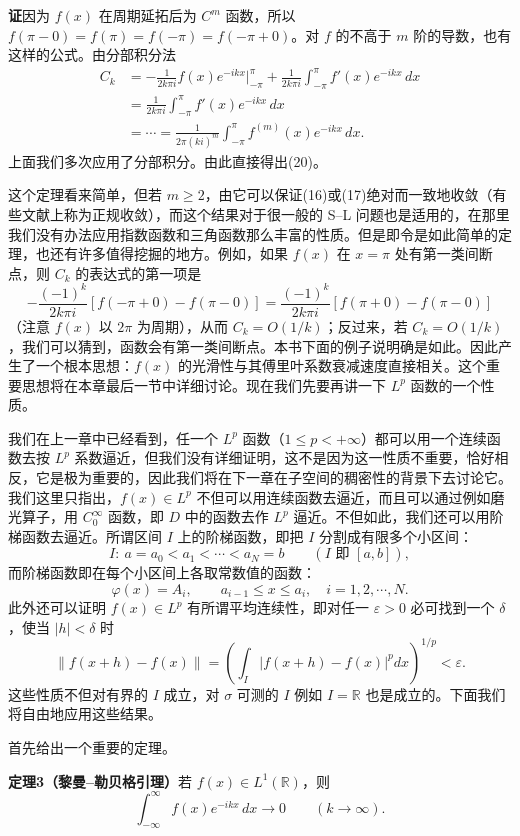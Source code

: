 \noindent\textbf{证}\quad 因为 $f(x)$ 在周期延拓后为 $C^m$ 函数，所以 $f(\pi-0)=f(\pi)=f(-\pi)=f(-\pi+0)$。对 $f$ 的不高于 $m$ 阶的导数，也有这样的公式。由分部积分法
\[
 \begin{aligned}
 C_k&=-\frac1{2k\pi i}f(x)e^{-ikx}\bigg|_{-\pi}^{\pi}
 +\frac1{2k\pi i}\int_{-\pi}^{\pi}f'(x)e^{-ikx}\,dx\\
 &=\frac1{2k\pi i}\int_{-\pi}^{\pi}f'(x)e^{-ikx}\,dx\\
 &=\cdots
 =\frac1{2\pi(ki)^m}\int_{-\pi}^{\pi}f^{(m)}(x)e^{-ikx}\,dx.
 \end{aligned}
\]
上面我们多次应用了分部积分。由此直接得出(20)。

这个定理看来简单，但若 $m\ge2$，由它可以保证(16)或(17)绝对而一致地收敛（有些文献上称为正规收敛），而这个结果对于很一般的 S--L 问题也是适用的，在那里我们没有办法应用指数函数和三角函数那么丰富的性质。但是即令是如此简单的定理，也还有许多值得挖掘的地方。例如，如果 $f(x)$ 在 $x=\pi$ 处有第一类间断点，则 $C_k$ 的表达式的第一项是
\[
 -\frac{(-1)^k}{2k\pi i}[f(-\pi+0)-f(\pi-0)]
 =\frac{(-1)^k}{2k\pi i}[f(\pi+0)-f(\pi-0)]
\]
（注意 $f(x)$ 以 $2\pi$ 为周期），从而 $C_k=O(1/k)$；反过来，若 $C_k=O(1/k)$，我们可以猜到，函数会有第一类间断点。本书下面的例子说明确是如此。因此产生了一个根本思想：$f(x)$ 的光滑性与其傅里叶系数衰减速度直接相关。这个重要思想将在本章最后一节中详细讨论。现在我们先要再讲一下 $L^p$ 函数的一个性质。

我们在上一章中已经看到，任一个 $L^p$ 函数（$1\le p<+\infty$）都可以用一个连续函数去按 $L^p$ 系数逼近，但我们没有详细证明，这不是因为这一性质不重要，恰好相反，它是极为重要的，因此我们将在下一章在子空间的稠密性的背景下去讨论它。我们这里只指出，$f(x)\in L^p$ 不但可以用连续函数去逼近，而且可以通过例如磨光算子，用 $C_0^\infty$ 函数，即 $D$ 中的函数去作 $L^p$ 逼近。不但如此，我们还可以用阶梯函数去逼近。所谓区间 $I$ 上的阶梯函数，即把 $I$ 分割成有限多个小区间：
\[
 I:\ a=a_0<a_1<\cdots<a_N=b\qquad (I\text{ 即 }[a,b]),
\]
而阶梯函数即在每个小区间上各取常数值的函数：
\[
 \varphi(x)=A_i,\qquad a_{i-1}\le x\le a_i,\quad i=1,2,\cdots,N.
\]
此外还可以证明 $f(x)\in L^p$ 有所谓平均连续性，即对任一 $\varepsilon>0$ 必可找到一个 $\delta$，使当 $|h|<\delta$ 时
\[
 \|f(x+h)-f(x)\|=\left(\int_I|f(x+h)-f(x)|^pdx\right)^{1/p}<\varepsilon.
\]
这些性质不但对有界的 $I$ 成立，对 $\sigma$ 可测的 $I$ 例如 $I=\mathbb R$ 也是成立的。下面我们将自由地应用这些结果。

首先给出一个重要的定理。

\noindent\textbf{定理3（黎曼--勒贝格引理）}\quad 若 $f(x)\in L^1(\mathbb R)$，则
\[
 \int_{-\infty}^{\infty}f(x)e^{-ikx}\,dx\to0\qquad(k\to\infty).
\]


